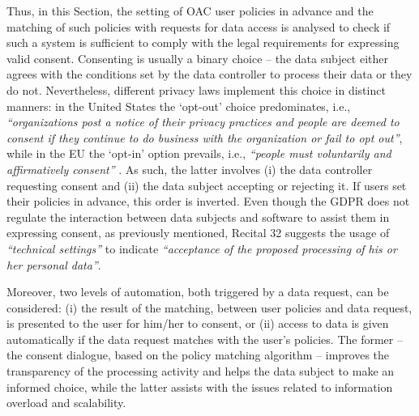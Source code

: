 Thus, in this Section, the setting of OAC user policies in advance and the matching of such policies with requests for data access is analysed to check if such a system is sufficient to comply with the legal requirements for expressing valid consent.
Consenting is usually a binary choice -- the data subject either agrees with the conditions set by the data controller to process their data or they do not.
Nevertheless, different privacy laws implement this choice in distinct manners: in the United States the `opt-out' choice predominates, i.e., \textit{``organizations post a notice of their privacy practices and people are deemed to consent if they continue to do business with the organization or fail to opt out''}, while in the EU the `opt-in' option prevails, i.e., \textit{``people must voluntarily and affirmatively consent''} \citep{solove_murky_2023}.
As such, the latter involves (i) the data controller requesting consent and (ii) the data subject accepting or rejecting it.
If users set their policies in advance, this order is inverted.
Even though the GDPR does not regulate the interaction between data subjects and software to assist them in expressing consent, as previously mentioned, Recital 32 \citeyearpar{noauthor_regulation_2016} suggests the usage of \textit{``technical settings''} to indicate \textit{``acceptance of the proposed processing of his or her personal data''}.

Moreover, two levels of automation, both triggered by a data request, can be considered: (i) the result of the matching, between user policies and data request, is presented to the user for him/her to consent, or (ii) access to data is given automatically if the data request matches with the user's policies.
The former -- the consent dialogue, based on the policy matching algorithm -- improves the transparency of the processing activity and helps the data subject to make an informed choice, while the latter assists with the issues related to information overload and scalability.

